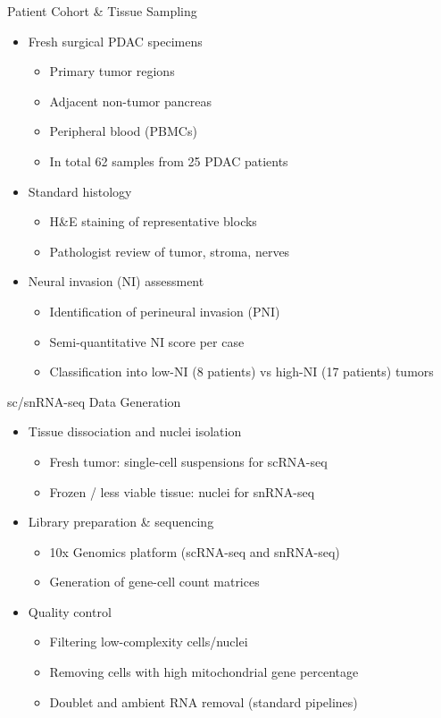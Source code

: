 \documentclass[10pt]{beamer}
\theoremstyle{plain}
\begin{document}
\begin{frame}{Patient Cohort \& Tissue Sampling}
  \begin{itemize}
    \item Fresh surgical PDAC specimens
    \begin{itemize}
      \item Primary tumor regions
      \item Adjacent non-tumor pancreas
      \item Peripheral blood (PBMCs)
      \item In total 62 samples from 25 PDAC patients
    \end{itemize}
    \item Standard histology
    \begin{itemize}
      \item H\&E staining of representative blocks
      \item Pathologist review of tumor, stroma, nerves
    \end{itemize}
    \item Neural invasion (NI) assessment
    \begin{itemize}
      \item Identification of perineural invasion (PNI)
      \item Semi-quantitative NI score per case
      \item Classification into low-NI (8 patients) vs high-NI (17 patients) tumors
    \end{itemize}
  \end{itemize}
\end{frame}

\begin{frame}{sc/snRNA-seq Data Generation}
  \begin{itemize}
    \item Tissue dissociation and nuclei isolation
    \begin{itemize}
      \item Fresh tumor: single-cell suspensions for scRNA-seq
      \item Frozen / less viable tissue: nuclei for snRNA-seq
    \end{itemize}
    \item Library preparation \& sequencing
    \begin{itemize}
      \item 10x Genomics platform (scRNA-seq and snRNA-seq)
      \item Generation of gene-cell count matrices
    \end{itemize}
    \item Quality control
    \begin{itemize}
      \item Filtering low-complexity cells/nuclei
      \item Removing cells with high mitochondrial gene percentage
      \item Doublet and ambient RNA removal (standard pipelines)
    \end{itemize}
  \end{itemize}
\end{frame}
\end{document}
